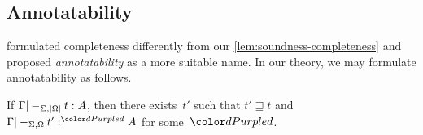 %
%
%
%
%

\subsection{Annotatability}
\label{sec:annotatability}


\citet[Section~3.2]{Dunfield2021} formulated completeness differently from our \cref{lem:soundness-completeness} and proposed \emph{annotatability} as a more suitable name.
In our theory, we may formulate annotatability as follows.

\begin{proposition}[Annotatability]\label{thm:annotatability}
If\/ $\Gamma |-_{\Sigma,\left|\Omega\right|} t : A$, then there exists~$t'$ such that\/ $t' \sqsupseteq t$ and $\Gamma |-_{\Sigma,\Omega} t' :^\dir{d} A$ for some~$\dir{d}$.
\end{proposition}

